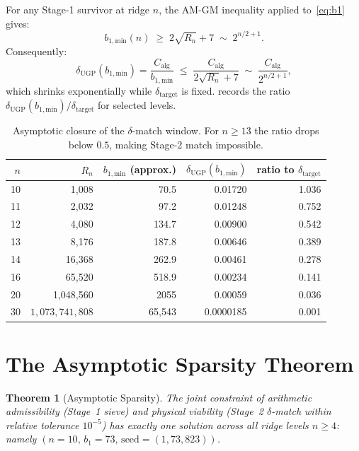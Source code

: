 \documentclass[11pt]{article}
\newtheorem{theorem}{Theorem}[section]
\theoremstyle{remark}
\newcommand{\bone}{b_1}
\newcommand{\bonemin}{b_{1,\mathrm{min}}}
\newcommand{\deltaNUGP}{\delta_{\mathrm{UGP}}}
\newcommand{\deltatar}{\delta_{\mathrm{target}}}
\newcommand{\Calg}{C_{\mathrm{alg}}}
\begin{document}
For any Stage-1 survivor at ridge $n$, the AM-GM inequality applied to~\eqref{eq:b1}
gives:
\begin{equation}
  \bonemin(n) \;\geq\; 2\sqrt{R_n} + 7 \;\sim\; 2^{n/2+1}.
  \label{eq:amgm}
\end{equation}
Consequently:
\begin{equation}
  \deltaNUGP(\bonemin) = \frac{\Calg}{\bonemin} \;\leq\;
  \frac{\Calg}{2\sqrt{R_n}+7} \;\sim\; \frac{\Calg}{2^{n/2+1}},
  \label{eq:delta_bound}
\end{equation}
which shrinks exponentially while $\deltatar$ is fixed.
 records the ratio $\deltaNUGP(\bonemin)/\deltatar$ for
selected levels.

\begin{table}[H]
\centering
\caption{Asymptotic closure of the $\delta$-match window.
  For $n \geq 13$ the ratio drops below $0.5$, making Stage-2 match impossible.}
\label{tab:asymptotic}
\small
\begin{tabular}{rrrrr}
\toprule
$n$ & $R_n$ & $\bonemin$ (approx.) & $\deltaNUGP(\bonemin)$ & ratio to $\deltatar$ \\
\midrule
10  &            1,008 &  70.5 & 0.01720 & 1.036 \\
11  &            2,032 &  97.2 & 0.01248 & 0.752 \\
12  &            4,080 & 134.7 & 0.00900 & 0.542 \\
13  &            8,176 & 187.8 & 0.00646 & 0.389 \\
14  &           16,368 & 262.9 & 0.00461 & 0.278 \\
16  &           65,520 & 518.9 & 0.00234 & 0.141 \\
20  &        1,048,560 & 2055  & 0.00059 & 0.036 \\
30  & $1{,}073{,}741{,}808$ & 65,543 & 0.0000185 & 0.001 \\
\bottomrule
\end{tabular}
\end{table}

\section{The Asymptotic Sparsity Theorem}
\label{sec:sparsity}

\begin{theorem}[Asymptotic Sparsity]
\label{thm:sparsity}
The joint constraint of arithmetic admissibility (Stage~1 sieve) and physical
viability (Stage~2 $\delta$-match within relative tolerance $10^{-5}$) has exactly
one solution across all ridge levels $n \geq 4$: namely
$(n{=}10,\,\bone{=}73,\,\mathrm{seed} = (1,73,823))$.
\end{theorem}
\end{document}
